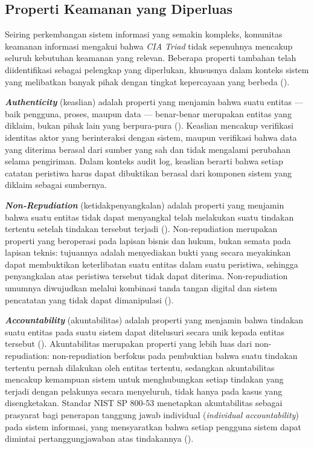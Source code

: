 \subsection{Properti Keamanan yang Diperluas}
\label{subsec:properti-keamanan-diperluas}

Seiring perkembangan sistem informasi yang semakin kompleks, komunitas
keamanan informasi mengakui bahwa \textit{CIA Triad} tidak sepenuhnya
mencakup seluruh kebutuhan keamanan yang relevan. Beberapa properti
tambahan telah diidentifikasi sebagai pelengkap yang diperlukan,
khususnya dalam konteks sistem yang melibatkan banyak pihak dengan
tingkat kepercayaan yang berbeda (\cite{iso27789_2021}).

\textbf{\textit{Authenticity}} (keaslian) adalah properti yang
menjamin bahwa suatu entitas --- baik pengguna, proses, maupun data
--- benar-benar merupakan entitas yang diklaim, bukan pihak lain yang
berpura-pura (\cite{nist80053r5}). Keaslian mencakup verifikasi
identitas aktor yang berinteraksi dengan sistem, maupun verifikasi
bahwa data yang diterima berasal dari sumber yang sah dan tidak
mengalami perubahan selama pengiriman. Dalam konteks audit log,
keaslian berarti bahwa setiap catatan peristiwa harus dapat dibuktikan
berasal dari komponen sistem yang diklaim sebagai sumbernya.

\textbf{\textit{Non-Repudiation}} (ketidakpenyangkalan) adalah
properti yang menjamin bahwa suatu entitas tidak dapat menyangkal
telah melakukan suatu tindakan tertentu setelah tindakan tersebut
terjadi (\cite{nist80053r5}). Non-repudiation merupakan properti yang
beroperasi pada lapisan bisnis dan hukum, bukan semata pada lapisan
teknis: tujuannya adalah menyediakan bukti yang secara meyakinkan
dapat membuktikan keterlibatan suatu entitas dalam suatu peristiwa,
sehingga penyangkalan atas peristiwa tersebut tidak dapat diterima.
Non-repudiation umumnya diwujudkan melalui kombinasi tanda tangan
digital dan sistem pencatatan yang tidak dapat dimanipulasi
(\cite{shostack2014}).

\textbf{\textit{Accountability}} (akuntabilitas) adalah properti yang
menjamin bahwa tindakan suatu entitas pada suatu sistem dapat
ditelusuri secara unik kepada entitas tersebut (\cite{nist80053r5}).
Akuntabilitas merupakan properti yang lebih luas dari non-repudiation:
non-repudiation berfokus pada pembuktian bahwa suatu tindakan tertentu
pernah dilakukan oleh entitas tertentu, sedangkan akuntabilitas
mencakup kemampuan sistem untuk menghubungkan setiap tindakan yang
terjadi dengan pelakunya secara menyeluruh, tidak hanya pada kasus
yang disengketakan. Standar NIST SP 800-53 menetapkan akuntabilitas
sebagai prasyarat bagi penerapan tanggung jawab individual
(\textit{individual accountability}) pada sistem informasi, yang
mensyaratkan bahwa setiap pengguna sistem dapat dimintai
pertanggungjawaban atas tindakannya (\cite{nist80053r5}).

